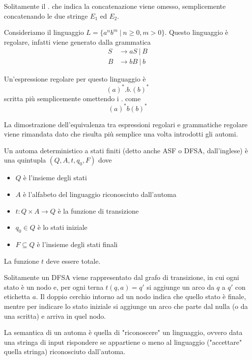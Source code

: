 \documentclass[12pt]{article}
\numberwithin{theorem}{subsection}
\begin{document}
Solitamente il $.$ che indica la concatenazione viene omesso, semplicemente concatenando le due stringe $E_1$ ed $E_2$.

\begin{example}
	Consideriamo il linguaggio $L = \{ a^n b^m \ \vert \ n \ge 0, m > 0 \}$. Questo linguaggio è regolare, infatti viene generato dalla grammatica
	\begin{align*}
		S &\rightarrow aS \ \vert \ B \\
		B &\rightarrow bB \ \vert \ b
	\end{align*}
	
	Un'espressione regolare per questo linguaggio è
	\[
	(a)^*.b.(b)^*
	\]
	scritta più semplicemente omettendo i $.$ come
	\[
	(a)^*b(b)^*
	\]
\end{example}

La dimostrazione dell'equivalenza tra espressioni regolari e grammatiche regolare viene rimandata dato che risulta più semplice una volta introdotti gli automi.

\begin{definition}
	Un automa deterministico a stati finiti (detto anche ASF o DFSA, dall'inglese) è una quintupla $( Q, A, t, q_0, F )$ dove
	\begin{itemize}
		\item $Q$ è l'insieme degli stati
		\item $A$ è l'alfabeto del linguaggio riconosciuto dall'automa
		\item $t: Q \times A \rightarrow Q$ è la funzione di transizione
		\item $q_0 \in Q$ è lo stati iniziale
		\item $F \subseteq Q$ è l'insieme degli stati finali
	\end{itemize}
	La funzione $t$ deve essere totale.
\end{definition}

Solitamente un DFSA viene rappresentato dal grafo di transizione, in cui ogni stato è un nodo e, per ogni terna $t(q, a) = q'$ si aggiunge un arco da $q$ a $q'$ con etichetta $a$. Il doppio cerchio intorno ad un nodo indica che quello stato è finale, mentre per indicare lo stato iniziale si aggiunge un arco che parte dal nulla (o da una scritta) e arriva in quel nodo.

La semantica di un automa è quella di "riconoscere" un linguaggio, ovvero data una stringa di input rispondere se appartiene o meno al linguaggio ("accettare" quella stringa) riconosciuto dall'automa.
\end{document}
